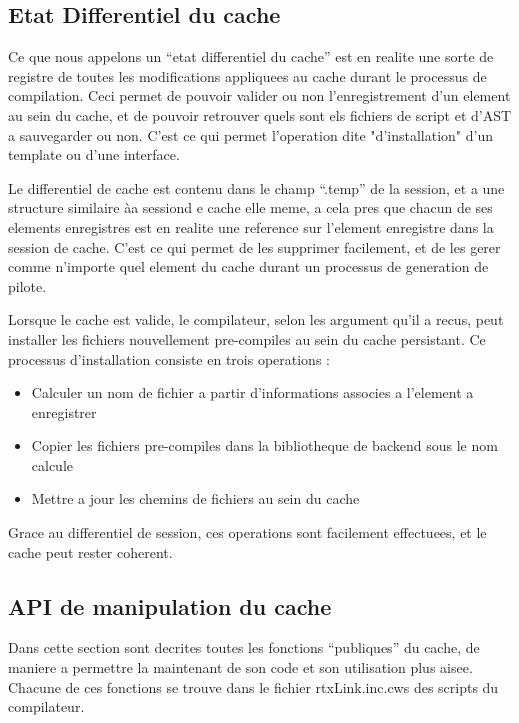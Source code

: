 \documentclass[french]{rtxreport}
\begin{document}
\subsection{Etat Differentiel du cache}

Ce que nous appelons un ``etat differentiel du cache'' est en realite une sorte
de registre de toutes les modifications appliquees au cache durant le processus
de compilation. Ceci permet de pouvoir valider ou non l'enregistrement d'un
element au sein du cache, et de pouvoir retrouver quels sont els fichiers de
script et d'AST a sauvegarder ou non. C'est ce qui permet l'operation dite
"d'installation" d'un template ou d'une interface.

Le differentiel de cache est contenu dans le champ ``.temp'' de la session, et
a une structure similaire àa sessiond e cache elle meme, a cela pres que chacun
de ses elements enregistres est en realite  une reference sur l'element
enregistre dans la session de cache. C'est ce qui permet de les supprimer
facilement, et de les gerer comme n'importe quel element du cache durant un
processus de generation de pilote.

Lorsque le cache est valide, le compilateur, selon les argument qu'il a recus,
peut installer les fichiers nouvellement pre-compiles au sein du cache
persistant. Ce processus d'installation consiste en trois operations :
\begin{itemize}
    \item Calculer un nom de fichier a partir d'informations associes a
        l'element a enregistrer
    \item Copier les fichiers pre-compiles dans la bibliotheque de backend sous
        le nom calcule
    \item Mettre a jour les chemins de fichiers au sein du cache
\end{itemize}

Grace au differentiel de session, ces operations sont facilement effectuees, et
le cache peut rester coherent.


\subsection{API de manipulation du cache}

Dans cette section sont decrites toutes les fonctions ``publiques'' du cache,
de maniere a permettre la maintenant de son code et son utilisation plus aisee.
Chacune de ces fonctions se trouve dans le fichier rtxLink.inc.cws des scripts
du compilateur.
\end{document}
